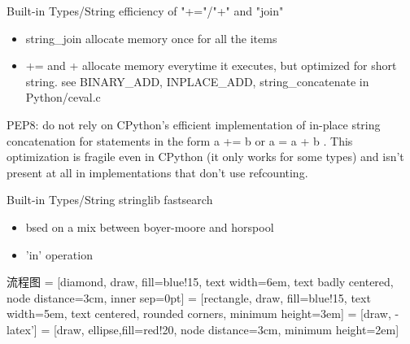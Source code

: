 \documentclass[xcolor=svgnames]{beamer}
\begin{document}
\begin{frame}{Built-in Types/String}
efficiency of "+="/"+" and "join"
\begin{itemize}
    \item string\_join allocate memory once for all the items
    \item += and + allocate memory everytime it executes, but optimized for short string. see BINARY\_ADD, INPLACE\_ADD, string\_concatenate in Python/ceval.c
\end{itemize}
PEP8: do not rely on CPython's efficient implementation of in-place string concatenation for statements in the form a += b or a = a + b . This optimization is fragile even in CPython (it only works for some types) and isn't present at all in implementations that don't use refcounting. 
\end{frame}

\begin{frame}{Built-in Types/String}
stringlib fastsearch 
\begin{itemize}
    \item bsed on a mix between boyer-moore and horspool
    \item 'in' operation
\end{itemize}
\end{frame}

\begin{frame}{流程图}
 = [diamond, draw, fill=blue!15, 
    text width=6em, text badly centered, node distance=3cm, inner sep=0pt]
 = [rectangle, draw, fill=blue!15, 
    text width=5em, text centered, rounded corners, minimum height=3em]
 = [draw, -latex']
 = [draw, ellipse,fill=red!20, node distance=3cm,
    minimum height=2em]
    
\end{frame}
\end{document}

